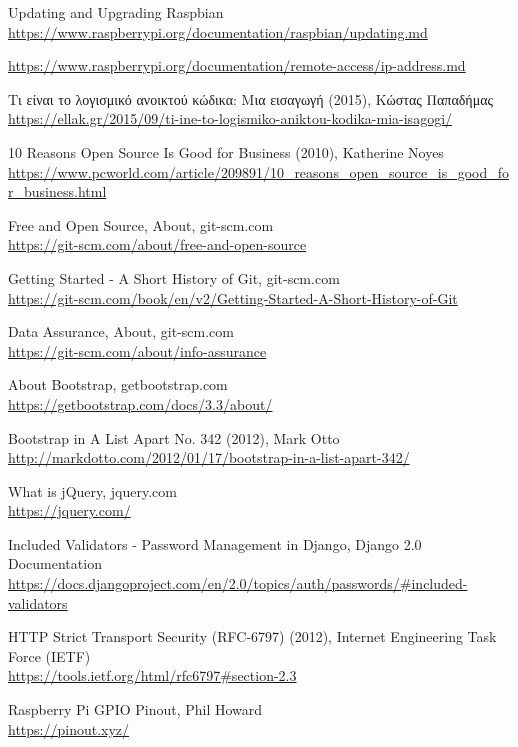 \begin{thebibliography}{99}
Updating and Upgrading Raspbian
\url{https://www.raspberrypi.org/documentation/raspbian/updating.md}

\url{https://www.raspberrypi.org/documentation/remote-access/ip-address.md}

Τι είναι το λογισμικό ανοικτού κώδικα: Μια εισαγωγή (2015), Κώστας Παπαδήμας\\
\url{https://ellak.gr/2015/09/ti-ine-to-logismiko-aniktou-kodika-mia-isagogi/}

10 Reasons Open Source Is Good for Business (2010), Katherine Noyes\\
\url{https://www.pcworld.com/article/209891/10_reasons_open_source_is_good_for_business.html}

Free and Open Source, About, git-scm.com\\
\url{https://git-scm.com/about/free-and-open-source}

Getting Started - A Short History of Git, git-scm.com\\
\url{https://git-scm.com/book/en/v2/Getting-Started-A-Short-History-of-Git}

Data Assurance, About, git-scm.com\\
\url{https://git-scm.com/about/info-assurance}

About Bootstrap, getbootstrap.com\\
\url{https://getbootstrap.com/docs/3.3/about/}

Bootstrap in A List Apart No. 342 (2012), Mark Otto\\
\url{http://markdotto.com/2012/01/17/bootstrap-in-a-list-apart-342/}

What is jQuery, jquery.com\\
\url{https://jquery.com/}

Included Validators - Password Management in Django, Django 2.0 Documentation\\
\url{https://docs.djangoproject.com/en/2.0/topics/auth/passwords/#included-validators}

HTTP Strict Transport Security (RFC-6797) (2012), Internet Engineering Task Force (IETF)\\
\url{https://tools.ietf.org/html/rfc6797#section-2.3}

Raspberry Pi GPIO Pinout, Phil Howard\\
\url{https://pinout.xyz/}


\end{thebibliography}
